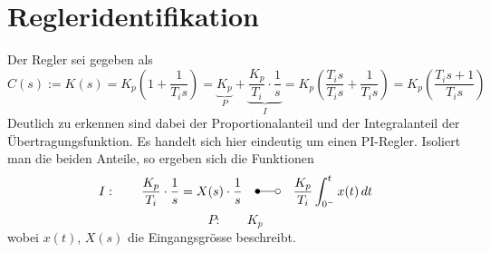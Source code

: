 \section{Regleridentifikation}
Der Regler sei gegeben als
\[
	C(s) := K(s) = K_p \left( 1 + \frac{1}{T_i s} \right)
	= \underbrace{K_p}_{P} + \underbrace{\frac{K_p}{T_i} \cdot \frac{1}{s}}_{I}
	= K_p \left( \frac{T_i s}{T_i s} + \frac{1}{T_i s} \right)
	= K_p \left( \frac{T_i s + 1}{T_i s} \right)
\]
Deutlich zu erkennen sind dabei der Proportionalanteil und der Integralanteil
der Übertragungsfunktion. Es handelt sich hier eindeutig um einen PI-Regler.
Isoliert man die beiden Anteile, so ergeben sich die Funktionen
\[
	I: \qquad \frac{K_p}{T_i} \cdot \frac{1}{s} 
	= X(s) \cdot \frac{1}{s}
		\quad \Laplace
		\quad \frac{K_p}{T_i} \int_{0^-}^{t} x(t)\,dt
\]
\[
	P: \qquad K_p
\]
wobei $x(t)$, $X(s)$ die Eingangsgrösse beschreibt. 
